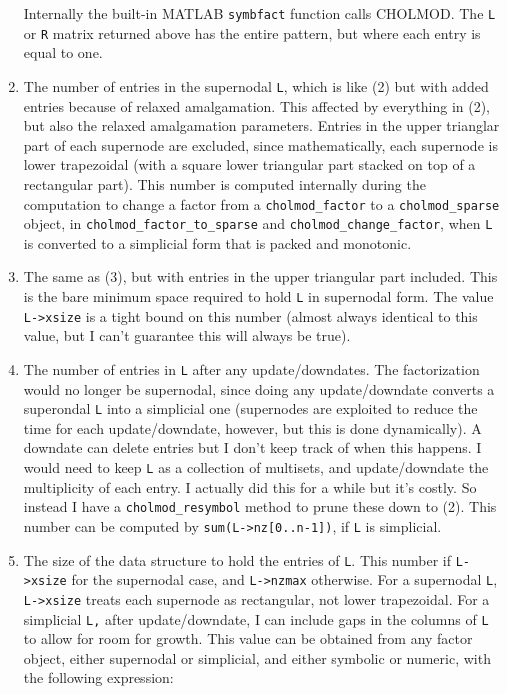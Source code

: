 \documentclass[11pt]{article}
\begin{document}
\begin{enumerate}
Internally the built-in MATLAB \verb'symbfact' function calls CHOLMOD.
The \verb'L' or \verb'R' matrix returned above has the entire pattern,
but where each entry is equal to one.

\item
The number of entries in the supernodal \verb'L', which is like (2) but with
added entries because of relaxed amalgamation. This affected by everything in
(2), but also the relaxed amalgamation parameters.  Entries in the upper
trianglar part of each supernode are excluded, since mathematically, each
supernode is lower trapezoidal (with a square lower triangular part stacked on
top of a rectangular part).  This number is computed internally during
the computation to change a factor from a \verb'cholmod_factor' to a
\verb'cholmod_sparse' object, in \verb'cholmod_factor_to_sparse'
and \verb'cholmod_change_factor', when \verb'L' is converted to a
simplicial form that is packed and monotonic.

\item
The same as (3), but with entries in the upper triangular part included.  This
is the bare minimum space required to hold \verb'L' in supernodal form.  The
value \verb'L->xsize' is a tight bound on this number (almost always identical
to this value, but I can't guarantee this will always be true).

\item
The number of entries in \verb'L' after any update/downdates.  The
factorization would no longer be supernodal, since doing any update/downdate
converts a superondal \verb'L' into a simplicial one (supernodes are exploited
to reduce the time for each update/downdate, however, but this is done
dynamically).  A downdate can delete entries but I don't keep track of when
this happens.  I would need to keep \verb'L' as a collection of multisets, and
update/downdate the multiplicity of each entry.  I actually did this for a
while but it's costly.  So instead I have a \verb'cholmod_resymbol' method to
prune these down to (2).  This number can be computed by
\verb'sum(L->nz[0..n-1])', if \verb'L' is simplicial.

\item
The size of the data structure to hold the entries of \verb'L'.  This
number if \verb'L->xsize' for the supernodal case, and \verb'L->nzmax'
otherwise. For a supernodal \verb'L', \verb'L->xsize' treats each supernode as
rectangular, not lower trapezoidal. For a simplicial \verb'L,' after
update/downdate, I can include gaps in the columns of \verb'L' to allow for
room for growth.  This value can be obtained from any factor object,
either supernodal or simplicial,  and either symbolic or numeric, with the
following expression:


\end{enumerate}
\end{document}
